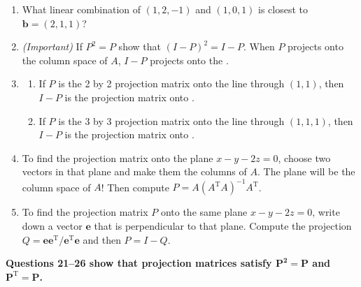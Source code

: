 \documentclass[14pt, a4paper]{article}
\begin{document}
\begin{enumerate}[resume]
    \item What linear combination of $(1, 2, -1)$ and $(1, 0, 1)$ is closest to $\boldsymbol{b} = (2, 1, 1)$?

    \item \emph{(Important)} If $P^2 = P$ show that $(I - P)^2 = I - P$. When $P$ projects onto the column space of $A$, $I - P$ projects onto the \underline{\hspace{2cm}}.

    \item
          \begin{enumerate}
              \item If $P$ is the 2 by 2 projection matrix onto the line through $(1, 1)$, then $I - P$ is the projection matrix onto \underline{\hspace{2cm}}.
              \item If $P$ is the 3 by 3 projection matrix onto the line through $(1, 1, 1)$, then $I - P$ is the projection matrix onto \underline{\hspace{2cm}}.
          \end{enumerate}

    \item To find the projection matrix onto the plane $x - y - 2z = 0$, choose two vectors in that plane and make them the columns of $A$. The plane will be the column space of $A$! Then compute $P = A(A^{\mathrm{T}}A)^{-1}A^{\mathrm{T}}$.

    \item To find the projection matrix $P$ onto the same plane $x - y - 2z = 0$, write down a vector $\boldsymbol{e}$ that is perpendicular to that plane. Compute the projection $Q = \boldsymbol{e}\boldsymbol{e}^{\mathrm{T}}/\boldsymbol{e}^{\mathrm{T}}\boldsymbol{e}$ and then $P = I - Q$.
\end{enumerate}

\noindent \textbf{Questions 21--26 show that projection matrices satisfy $\boldsymbol{P^2 = P}$ and $\boldsymbol{P^{\mathrm{T}} = P}$.}
\end{document}
